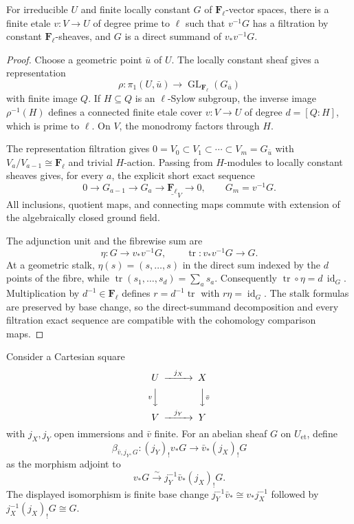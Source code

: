 \begin{lemma}
\label{lemma:weil-pbc-curve-locally-constant-reduction}
\uses{}

For irreducible $U$ and finite locally constant $G$ of
$\mathbf F_\ell$-vector spaces, there is a finite etale
$v:V\to U$ of degree prime to $\ell$ such that $v^{-1}G$ has a filtration by
constant $\mathbf F_\ell$-sheaves, and $G$ is a direct summand of
$v_*v^{-1}G$.
\end{lemma}
\begin{proof}

Choose a geometric point $\bar u$ of $U$.  The locally constant sheaf gives
a representation
\[
 \rho:\pi_1(U,\bar u)\longrightarrow
 \operatorname{GL}_{\mathbf F_\ell}(G_{\bar u})
\]
with finite image $Q$.  If $H\subseteq Q$ is an $\ell$-Sylow subgroup, the
inverse image $\rho^{-1}(H)$ defines a connected finite etale cover
$v:V\to U$ of degree $d=[Q:H]$, which is prime to $\ell$.  On $V$, the
monodromy factors through $H$.

The representation filtration gives
$0=V_0\subset V_1\subset\cdots\subset V_m=G_{\bar u}$ with
$V_a/V_{a-1}\cong\mathbf F_\ell$ and trivial $H$-action.  Passing from
$H$-modules to locally constant sheaves gives, for every $a$, the explicit
short exact sequence
\[
 0\longrightarrow G_{a-1}\longrightarrow G_a\longrightarrow
 \underline{\mathbf F_\ell}_V\longrightarrow0,
 \qquad G_m=v^{-1}G.
\]
All inclusions, quotient maps, and connecting maps commute with extension of
the algebraically closed ground field.

The adjunction unit and the fibrewise sum are
\[
 \eta:G\longrightarrow v_*v^{-1}G,\qquad
 \operatorname{tr}:v_*v^{-1}G\longrightarrow G.
\]
At a geometric stalk, $\eta(s)=(s,\ldots,s)$ in the direct sum indexed by
the $d$ points of the fibre, while
$\operatorname{tr}(s_1,\ldots,s_d)=\sum_as_a$.  Consequently
$\operatorname{tr}\circ\eta=d\,\operatorname{id}_G$.  Multiplication by
$d^{-1}\in\mathbf F_\ell$ defines
$r=d^{-1}\operatorname{tr}$ with $r\eta=\operatorname{id}_G$.
The stalk formulas are preserved by base change, so the direct-summand
decomposition and every filtration exact sequence are compatible with the
cohomology comparison maps.
\end{proof}

\begin{definition}
\label{def:weil-pbc-finite-open-comparison}
\uses{}
Consider a Cartesian square
\[
\begin{CD}
 U @>{j_X}>> X\\
 @V{v}VV @VV{\bar v}V\\
 V @>{j_Y}>> Y
\end{CD}
\]
with $j_X,j_Y$ open immersions and $\bar v$ finite.  For an abelian sheaf
$G$ on $U_{\mathrm{et}}$, define
\[
 \beta_{\bar v,j_Y,G}:(j_Y)_!v_*G\longrightarrow
 \bar v_*(j_X)_!G
\]
as the morphism adjoint to
\[
 v_*G\xrightarrow{\sim}
 j_Y^{-1}\bar v_*(j_X)_!G.
\]
The displayed isomorphism is finite base change
$j_Y^{-1}\bar v_*\cong v_*j_X^{-1}$ followed by
$j_X^{-1}(j_X)_!G\cong G$.
\end{definition}

